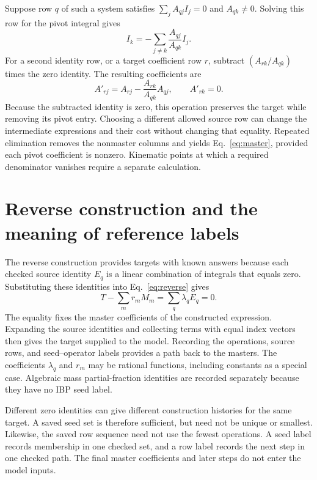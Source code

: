 Suppose row $q$ of such a system satisfies $\sum_jA_{qj}I_j=0$ and $A_{qk}\ne0$. Solving this row for the pivot integral gives
\begin{equation}
 I_k=-\sum_{j\ne k}\frac{A_{qj}}{A_{qk}}I_j.
 \label{eq:pivot}
\end{equation}
For a second identity row, or a target coefficient row $r$, subtract $(A_{rk}/A_{qk})$ times the zero identity. The resulting coefficients are
\begin{equation}
 A'_{rj}=A_{rj}-\frac{A_{rk}}{A_{qk}}A_{qj},
 \qquad A'_{rk}=0.
 \label{eq:row}
\end{equation}
Because the subtracted identity is zero, this operation preserves the target while removing its pivot entry. Choosing a different allowed source row can change the intermediate expressions and their cost without changing that equality. Repeated elimination removes the nonmaster columns and yields Eq.~\eqref{eq:master}, provided each pivot coefficient is nonzero. Kinematic points at which a required denominator vanishes require a separate calculation.

\section{Reverse construction and the meaning of reference labels}
\label{app:construction}
The reverse construction provides targets with known answers because each checked source identity $E_q$ is a linear combination of integrals that equals zero. Substituting these identities into Eq.~\eqref{eq:reverse} gives
\begin{equation}
 T-\sum_mr_mM_m=\sum_q\lambda_qE_q=0.
 \label{eq:reverse-check}
\end{equation}
The equality fixes the master coefficients of the constructed expression. Expanding the source identities and collecting terms with equal index vectors then gives the target supplied to the model. Recording the operations, source rows, and seed--operator labels provides a path back to the masters. The coefficients $\lambda_q$ and $r_m$ may be rational functions, including constants as a special case. Algebraic mass partial-fraction identities are recorded separately because they have no IBP seed label.

Different zero identities can give different construction histories for the same target. A saved seed set is therefore sufficient, but need not be unique or smallest. Likewise, the saved row sequence need not use the fewest operations. A seed label records membership in one checked set, and a row label records the next step in one checked path. The final master coefficients and later steps do not enter the model inputs.

